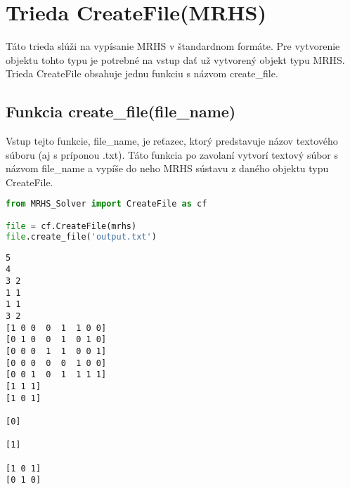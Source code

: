 



\section{Trieda CreateFile(MRHS)}
Táto trieda slúži na vypísanie MRHS v štandardnom formáte. Pre vytvorenie objektu tohto typu je potrebné na vstup dať už vytvorený objekt typu MRHS. Trieda CreateFile obsahuje jednu funkciu s názvom create\_file. 

\subsection{Funkcia create\_file(file\_name)}
Vstup tejto funkcie, file\_name, je reťazec, ktorý predstavuje názov textového súboru (aj s príponou .txt). Táto funkcia po zavolaní vytvorí textový súbor s názvom file\_name a vypíše do neho MRHS sústavu z daného objektu typu CreateFile. \newline
\lstset{style=mystyle}
\begin{lstlisting}[language=Python, caption=Príklad volania funkcie create\_file(file\_name)]
from MRHS_Solver import CreateFile as cf

file = cf.CreateFile(mrhs)
file.create_file('output.txt')
\end{lstlisting}

\begin{lstlisting}[caption=Príklad výstupného textového súboru funkcie create\_file(file\_name)]
5
4
3 2
1 1
1 1
3 2
[1 0 0  0  1  1 0 0]
[0 1 0  0  1  0 1 0]
[0 0 0  1  1  0 0 1]
[0 0 0  0  0  1 0 0]
[0 0 1  0  1  1 1 1]
[1 1 1]
[1 0 1]

[0]

[1]

[1 0 1]
[0 1 0]
\end{lstlisting}